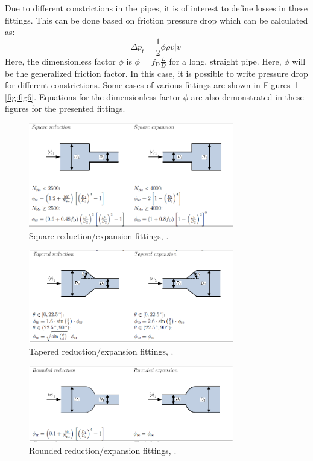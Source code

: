 \documentclass[%
]{USN-PhD}
\begin{document}
Due to different constrictions in the pipes, it is of interest to define losses in these fittings. This can be done based on friction pressure drop which can be calculated as:
\begin{equation}\label{eq:eq14}
\Delta p_\mathrm{f}=\frac{1}{2}\phi\rho v|v|
\end{equation}
Here, the dimensionless factor $\phi$ is $\phi=f_\mathrm{D}\frac{L}{D}$ for a long, straight pipe. Here, $\phi$ will be the generalized friction factor. In this case, it is possible to write pressure drop for different constrictions. Some cases of various fittings are shown in Figures~\ref{fig:fig3}-\ref{fig:fig6}. Equations for the dimensionless factor $\phi$  are also demonstrated in these figures for the presented fittings.
\begin{figure}[!ht]
  \centering
 \includegraphics[width=0.8\textwidth]{fig/Square_fi}
 \caption{Square reduction/expansion fittings, \cite{LieL:18}.}
  \label{fig:fig3}
\end{figure}
\begin{figure}[!ht]
  \centering
 \includegraphics[width=0.8\textwidth]{fig/Tapered_fit}
 \caption{Tapered reduction/expansion fittings, \cite{LieL:18}.}
  \label{fig:fig4}
\end{figure}
\begin{figure}[!ht]
  \centering
 \includegraphics[width=0.8\textwidth]{fig/Rounded_fit}
 \caption{Rounded reduction/expansion fittings, \cite{LieL:18}.}
  \label{fig:fig5}
\end{figure}
\end{document}
